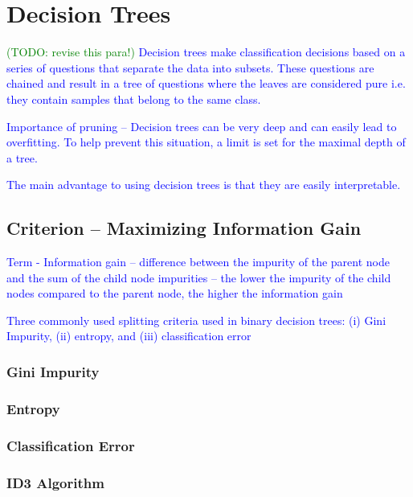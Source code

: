 \section{Decision Trees}

\textcolor{blue}{\textcolor{green}{(TODO: revise this para!)} Decision trees make classification decisions based on a series of questions that separate the data into subsets. These questions are chained and result in a tree of questions where the leaves are considered pure i.e. they contain samples that belong to the same class.}

\textcolor{blue}{Importance of pruning -- Decision trees can be very deep and can easily lead to overfitting. To help prevent this situation, a limit is set for the maximal depth of a tree. }

\textcolor{blue}{The main advantage to using decision trees is that they are easily interpretable.}

\subsection{Criterion -- Maximizing Information Gain}

\textcolor{blue}{Term - Information gain -- difference between the impurity of the parent node and the sum of the child node impurities -- the lower the impurity of the child nodes compared to the parent node, the higher the information gain}

\textcolor{blue}{Three commonly used splitting criteria used in binary decision trees: (i) Gini Impurity, (ii) entropy, and (iii) classification error}

\subsubsection{Gini Impurity}

\subsubsection{Entropy}

\subsubsection{Classification Error}

\subsubsection{ID3 Algorithm}


